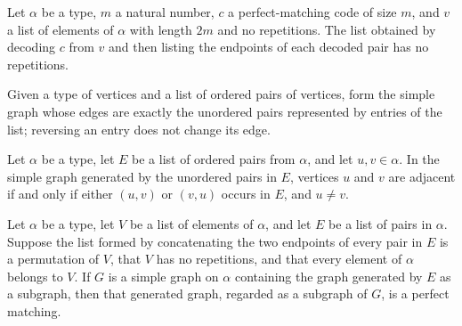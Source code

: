 \begin{theorem}
\label{FABL.flattenPairList_decodePerfectMatchingCode_nodup}
\leanok
{}
Let $\alpha$ be a type, $m$ a natural number, $c$ a perfect-matching code of size $m$,
and $v$ a list of elements of $\alpha$ with length $2m$ and no repetitions. The list
obtained by decoding $c$ from $v$ and then listing the endpoints of each decoded pair
has no repetitions.
\end{theorem}

\begin{definition}
\label{FABL.pairListGraph}
\leanok
Given a type of vertices and a list of ordered pairs of vertices, form the simple graph
whose edges are exactly the unordered pairs represented by entries of the list;
reversing an entry does not change its edge.
\end{definition}

\begin{theorem}
\label{FABL.pairListGraph_adj_iff}
\leanok
{}
Let $\alpha$ be a type, let $E$ be a list of ordered pairs from $\alpha$, and let
$u,v\in\alpha$. In the simple graph generated by the unordered pairs in $E$, vertices
$u$ and $v$ are adjacent if and only if either $(u,v)$ or $(v,u)$ occurs in $E$, and
$u\ne v$.
\end{theorem}

\begin{theorem}
\label{FABL.pairListGraph_isPerfectMatching}
\leanok
{}
Let $\alpha$ be a type, let $V$ be a list of elements of $\alpha$, and let $E$ be a list
of pairs in $\alpha$. Suppose the list formed by concatenating the two endpoints of
every pair in $E$ is a permutation of $V$, that $V$ has no repetitions, and that every
element of $\alpha$ belongs to $V$. If $G$ is a simple graph on $\alpha$ containing the
graph generated by $E$ as a subgraph, then that generated graph, regarded as a subgraph
of $G$, is a perfect matching.
\end{theorem}

